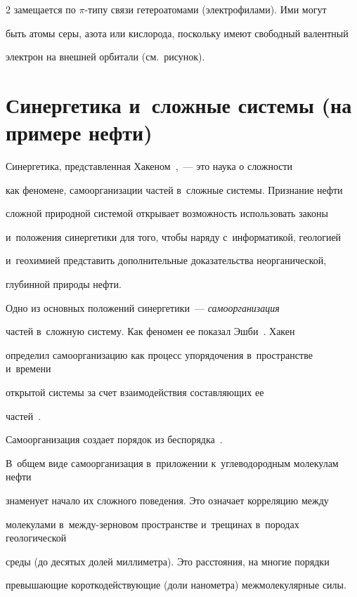 \begin{multicols}{2}
замещается по $\pi$-ти\-пу связи гетероатомами (электрофилами). Ими могут 

быть атомы серы, азота или кислорода, поскольку имеют свободный валентный 

электрон на внешней орбитали (см.\ рисунок).



\vspace*{-6pt}

    

\section{Синергетика и~сложные системы (на примере нефти)}



    Синергетика, представленная Хакеном~\cite{9-s},~--- это наука о сложности 

как феномене, самоорганизации частей в~сложные системы. Признание нефти 

сложной природной системой открывает возможность использовать законы 

и~положения синергетики для того, чтобы наряду с~информатикой, геологией 

и~геохимией представить дополнительные доказательства неорганической, 

глубинной природы нефти.

    

    Одно из основных положений синергетики~--- \textit{самоорганизация} 

частей в~сложную систему. Как феномен ее показал Эшби~\cite{10-s}. Хакен 

определил самоорганизацию как процесс упорядочения в~пространстве и~времени 

открытой системы за счет взаимодействия составляющих ее 

частей~\cite[с.~147]{11-s}.  

Самоорганизация создает порядок из беспорядка~\cite[с.~235--240]{12-s}. 

В~общем виде самоорганизация в~приложении к~углеводородным мо\-ле\-ку\-лам нефти 

знаменует начало их сложного поведения. Это означает корреляцию между 

молекулами в~между-зерновом пространстве и~трещинах в~породах геологической 

среды (до десятых долей миллиметра). Это расстояния, на многие порядки 

превышающие короткодействующие (доли нанометра) межмолекулярные силы. 


\end{multicols}
